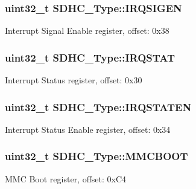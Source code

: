 \subsubsection[{\texorpdfstring{I\+R\+Q\+S\+I\+G\+EN}{IRQSIGEN}}]{ uint32\+\_\+t S\+D\+H\+C\+\_\+\+Type\+::\+I\+R\+Q\+S\+I\+G\+EN}\hypertarget{structSDHC__Type_a8b5ad3feb78b656f69a11c2c4db1e935}{}\label{structSDHC__Type_a8b5ad3feb78b656f69a11c2c4db1e935}
Interrupt Signal Enable register, offset\+: 0x38 
\subsubsection[{\texorpdfstring{I\+R\+Q\+S\+T\+AT}{IRQSTAT}}]{ uint32\+\_\+t S\+D\+H\+C\+\_\+\+Type\+::\+I\+R\+Q\+S\+T\+AT}\hypertarget{structSDHC__Type_ac8cb5cc51087466438d5e4a512ccffb3}{}\label{structSDHC__Type_ac8cb5cc51087466438d5e4a512ccffb3}
Interrupt Status register, offset\+: 0x30 
\subsubsection[{\texorpdfstring{I\+R\+Q\+S\+T\+A\+T\+EN}{IRQSTATEN}}]{ uint32\+\_\+t S\+D\+H\+C\+\_\+\+Type\+::\+I\+R\+Q\+S\+T\+A\+T\+EN}\hypertarget{structSDHC__Type_a200633179af8e6f9ea82b31c1d193b3e}{}\label{structSDHC__Type_a200633179af8e6f9ea82b31c1d193b3e}
Interrupt Status Enable register, offset\+: 0x34 
\subsubsection[{\texorpdfstring{M\+M\+C\+B\+O\+OT}{MMCBOOT}}]{ uint32\+\_\+t S\+D\+H\+C\+\_\+\+Type\+::\+M\+M\+C\+B\+O\+OT}\hypertarget{structSDHC__Type_a7d817bac2e7c2d53cff0703b76dddb3f}{}\label{structSDHC__Type_a7d817bac2e7c2d53cff0703b76dddb3f}
M\+MC Boot register, offset\+: 0x\+C4 
